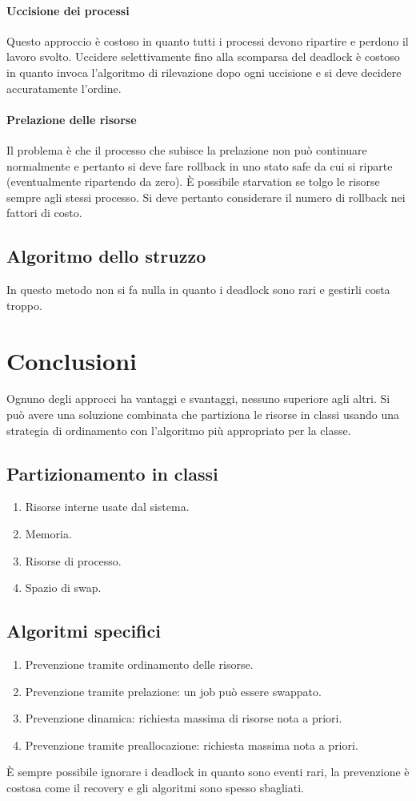 \paragraph{Uccisione dei processi}
Questo approccio \`e costoso in quanto tutti i processi devono ripartire e perdono il lavoro svolto. Uccidere selettivamente fino alla scomparsa del deadlock \`e costoso in quanto
invoca l'algoritmo di rilevazione dopo ogni uccisione e si deve decidere accuratamente l'ordine. 
\paragraph{Prelazione delle risorse}
Il problema \`e che il processo che subisce la prelazione non pu\`o continuare normalmente e pertanto si deve fare rollback in uno stato safe da cui si riparte (eventualmente ripartendo
da zero). \`E possibile starvation se tolgo le risorse sempre agli stessi processo. Si deve pertanto considerare il numero di rollback nei fattori di costo. 
\subsection{Algoritmo dello struzzo}
In questo metodo non si fa nulla in quanto i deadlock sono rari e gestirli costa troppo. 
\section{Conclusioni}
Ognuno degli approcci ha vantaggi e svantaggi, nessuno superiore agli altri. Si pu\`o avere una soluzione combinata che partiziona le risorse in classi usando una strategia di 
ordinamento con l'algoritmo pi\`u appropriato per la classe.
\subsection{Partizionamento in classi}
\begin{enumerate}
	\item Risorse interne usate dal sistema.
	\item Memoria.
	\item Risorse di processo.
	\item Spazio di swap.
\end{enumerate}
\subsection{Algoritmi specifici}
\begin{enumerate}
	\item Prevenzione tramite ordinamento delle risorse.
	\item Prevenzione tramite prelazione: un job pu\`o essere swappato.
	\item Prevenzione dinamica: richiesta massima di risorse nota a priori.
	\item Prevenzione tramite preallocazione: richiesta massima nota a priori.
\end{enumerate}
\`E sempre possibile ignorare i deadlock in quanto sono eventi rari, la prevenzione \`e costosa come il recovery e gli algoritmi sono spesso sbagliati. 

